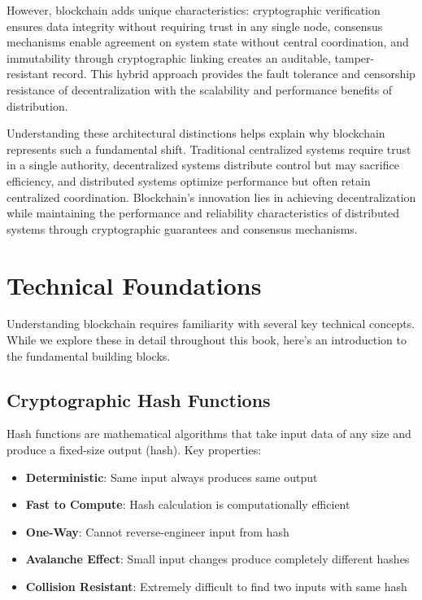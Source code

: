 However, blockchain adds unique characteristics: cryptographic verification ensures data integrity without requiring trust in any single node, consensus mechanisms enable agreement on system state without central coordination, and immutability through cryptographic linking creates an auditable, tamper-resistant record. This hybrid approach provides the fault tolerance and censorship resistance of decentralization with the scalability and performance benefits of distribution.

Understanding these architectural distinctions helps explain why blockchain represents such a fundamental shift. Traditional centralized systems require trust in a single authority, decentralized systems distribute control but may sacrifice efficiency, and distributed systems optimize performance but often retain centralized coordination. Blockchain's innovation lies in achieving decentralization while maintaining the performance and reliability characteristics of distributed systems through cryptographic guarantees and consensus mechanisms.

\section{Technical Foundations}
\label{sec:technical-foundations}

Understanding blockchain requires familiarity with several key technical concepts. While we explore these in detail throughout this book, here's an introduction to the fundamental building blocks.

\subsection{Cryptographic Hash Functions}
\label{subsec:hash-functions}

Hash functions are mathematical algorithms that take input data of any size and produce a fixed-size output (hash). Key properties:

\begin{itemize}
  \item \textbf{Deterministic}: Same input always produces same output
  \item \textbf{Fast to Compute}: Hash calculation is computationally efficient
  \item \textbf{One-Way}: Cannot reverse-engineer input from hash
  \item \textbf{Avalanche Effect}: Small input changes produce completely different hashes
  \item \textbf{Collision Resistant}: Extremely difficult to find two inputs with same hash
\end{itemize}

